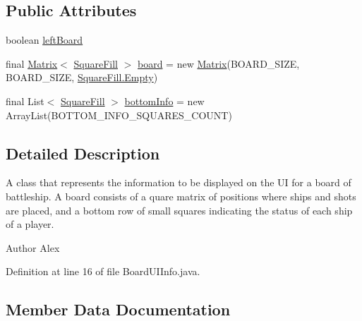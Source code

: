 \subsection*{Public Attributes}
\begin{DoxyCompactItemize}
\item 
boolean \hyperlink{classpt_1_1up_1_1fe_1_1lpro1613_1_1sharedlib_1_1structs_1_1_board_u_i_info_ab18de6ba93265ba5e4d4823b905faf59}{left\+Board}
\item 
final \hyperlink{classpt_1_1up_1_1fe_1_1lpro1613_1_1sharedlib_1_1utils_1_1_matrix}{Matrix}$<$ \hyperlink{enumpt_1_1up_1_1fe_1_1lpro1613_1_1sharedlib_1_1structs_1_1_board_u_i_info_1_1_square_fill}{Square\+Fill} $>$ \hyperlink{classpt_1_1up_1_1fe_1_1lpro1613_1_1sharedlib_1_1structs_1_1_board_u_i_info_a289d27ea675dffe5271c99af1652925e}{board} = new \hyperlink{classpt_1_1up_1_1fe_1_1lpro1613_1_1sharedlib_1_1utils_1_1_matrix}{Matrix}(B\+O\+A\+R\+D\+\_\+\+S\+I\+ZE, B\+O\+A\+R\+D\+\_\+\+S\+I\+ZE, \hyperlink{enumpt_1_1up_1_1fe_1_1lpro1613_1_1sharedlib_1_1structs_1_1_board_u_i_info_1_1_square_fill_aa0edda009450224fb980df8b8f028717}{Square\+Fill.\+Empty})
\item 
final List$<$ \hyperlink{enumpt_1_1up_1_1fe_1_1lpro1613_1_1sharedlib_1_1structs_1_1_board_u_i_info_1_1_square_fill}{Square\+Fill} $>$ \hyperlink{classpt_1_1up_1_1fe_1_1lpro1613_1_1sharedlib_1_1structs_1_1_board_u_i_info_a0f3cbddd3c439328482569c223155d4f}{bottom\+Info} = new Array\+List(B\+O\+T\+T\+O\+M\+\_\+\+I\+N\+F\+O\+\_\+\+S\+Q\+U\+A\+R\+E\+S\+\_\+\+C\+O\+U\+NT)
\end{DoxyCompactItemize}


\subsection{Detailed Description}
A class that represents the information to be displayed on the UI for a board of battleship. A board consists of a quare matrix of positions where ships and shots are placed, and a bottom row of small squares indicating the status of each ship of a player.

\begin{DoxyAuthor}{Author}
Alex 
\end{DoxyAuthor}


Definition at line 16 of file Board\+U\+I\+Info.\+java.



\subsection{Member Data Documentation}
\hypertarget{classpt_1_1up_1_1fe_1_1lpro1613_1_1sharedlib_1_1structs_1_1_board_u_i_info_a289d27ea675dffe5271c99af1652925e}{}\label{classpt_1_1up_1_1fe_1_1lpro1613_1_1sharedlib_1_1structs_1_1_board_u_i_info_a289d27ea675dffe5271c99af1652925e} 
